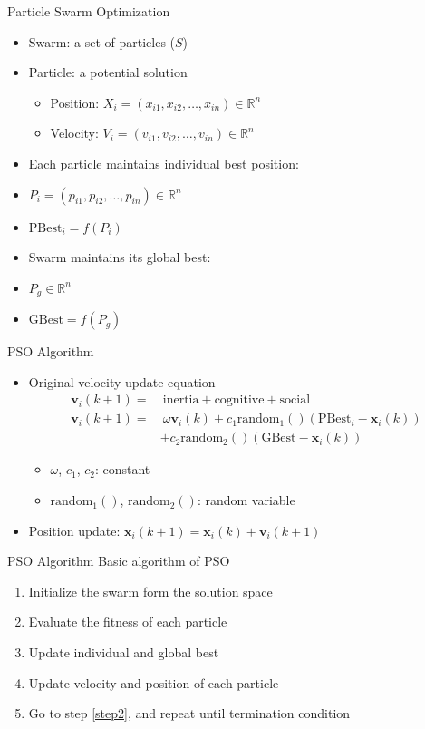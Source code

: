 \documentclass[pdflatex,compress,mathserif]{beamer}
\begin{document}
\begin{frame}{Particle Swarm Optimization}
	\begin{itemize}
		\item Swarm: a set of particles ($S$)
		\item Particle: a potential solution
		\begin{itemize}
			\item Position: $X_i = (x_{i1},x_{i2},\dots,x_{in}) \in \mathbb{R}^n$
			\item Velocity: $V_i = (v_{i1},v_{i2},\dots,v_{in}) \in \mathbb{R}^n$
		\end{itemize}
		\item Each particle maintains individual best position:
		\item[] $P_i = (p_{i1}, p_{i2}, \dots, p_{in}) \in \mathbb{R}^n$
		\item[] $\text{PBest}_i = f(P_i)$
		\item Swarm maintains its global best:
		\item[] $P_g \in \mathbb{R}^n$
		\item[] $\text{GBest} = f(P_g)$
	\end{itemize}
\end{frame}

\begin{frame}{PSO Algorithm}
	\begin{itemize}
		\item Original velocity update equation
		\begin{align*}
			\mathbf{v}_i (k+1) =&~ \text{inertia} + \text{cognitive} + \text{social} \\
			\mathbf{v}_i(k+1) =&~ \omega \mathbf{v}_i(k) + c_1 \text{random}_1()(\text{PBest}_i - \mathbf{x}_i(k))\\
			&+ c_2 \text{random}_2()(\text{GBest} - \mathbf{x}_i(k))
		\end{align*}
		\begin{itemize}
			\item $\omega$, $c_1$, $c_2$: constant
			\item $\text{random}_1()$, $\text{random}_2()$: random variable
		\end{itemize}
		\item Position update: $\mathbf{x}_i(k+1) = \mathbf{x}_i(k) + \mathbf{v}_i(k+1)$
	\end{itemize}
\end{frame}

\begin{frame}{PSO Algorithm}
	Basic algorithm of PSO
	\begin{enumerate}
		\item Initialize the swarm form the solution space 
		\item Evaluate the fitness of each particle \label{step2}
		\item Update individual and global best
		\item Update velocity and position of each particle
		\item Go to step \ref{step2}, and repeat until termination condition
	\end{enumerate}
\end{frame}
\end{document}
